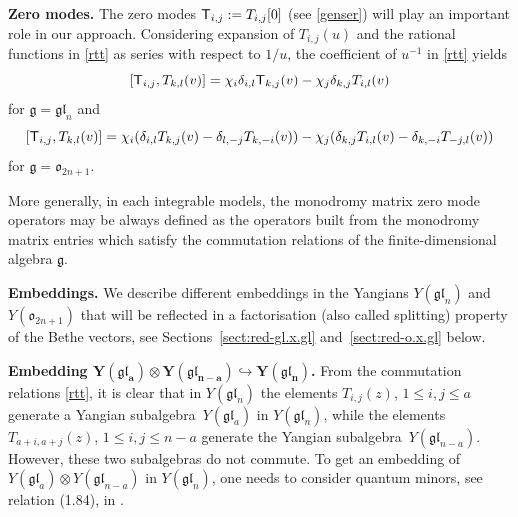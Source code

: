 \documentclass[pdftex]{sigma}
\theoremstyle{definition}
\def\r#1{\eqref{#1}}
\def\sT{{\sf T}}
\def\vk{\chi}
\begin{document}
{\bf Zero modes.}
The zero modes $\sT_{i,j} := T_{i,j}[0]$ (see \eqref{genser}) will play an important role in
our approach.
Considering expansion of $T_{i,j}(u)$ and the rational functions in \r{rtt} as series with respect to $1/u$, the coefficient of $u^{-1}$ in \r{rtt} yields
\begin{equation}
\label{Azm}
[\sT_{i,j},T_{k,l}(v)]=\vk_i \delta_{i,l} \sT_{k,j}(v)- \vk_j \delta_{k,j} T_{i,l}(v)
\end{equation}
for $\mathfrak{g}=\mathfrak{gl}_n$ and
\begin{equation}
\label{zm1}
[\sT_{i,j},T_{k,l}(v)]=\vk_i (\delta_{i,l} T_{k,j}(v)-\delta_{l,-j} T_{k,-i}(v))
-\vk_j (\delta_{k,j} T_{i,l}(v)-\delta_{k,-i} T_{-j,l}(v))
\end{equation}
for $\mathfrak{g}=\mathfrak{o}_{2n+1}$.

More generally,
in each integrable models,
 the monodromy matrix zero mode operators may be always defined as the
 operators built from the monodromy matrix entries
 which
satisfy the commutation relations of the finite-dimensional algebra $\mathfrak{g}$.



{\bf Embeddings.}
We describe different embeddings in the Yangians $Y(\mathfrak{gl}_{n})$ and $Y(\mathfrak{o}_{2n+1})$ that will be reflected in a factorisation (also called splitting) property of the Bethe vectors, see Sections~\ref{sect:red-gl.x.gl} and~\ref{sect:red-o.x.gl} below.


{\bf Embedding $\boldsymbol{Y(\mathfrak{gl}_a)\otimes Y(\mathfrak{gl}_{n-a})
\hookrightarrow Y(\mathfrak{gl}_{n})}$.}
From the commutation relations \eqref{rtt}, it is clear that in $Y(\mathfrak{gl}_{n})$ the elements
$T_{i,j}(z)$, $1\leq i,j\leq a$ generate a Yangian subalgebra~$Y(\mathfrak{gl}_{a})$ in $Y(\mathfrak{gl}_{n})$, while the elements $T_{a+i,a+j}(z)$, $1\leq i,j\leq n-a$ generate the Yangian subalgebra~$Y(\mathfrak{gl}_{n-a})$. However, these two subalgebras do not commute. To get an embedding of~${Y(\mathfrak{gl}_a)\otimes Y(\mathfrak{gl}_{n-a})}$ in $Y(\mathfrak{gl}_{n})$, one needs to consider quantum minors,
see relation (1.84), in \cite[Corollaries 1.7.2 and 1.11.4]{Molev}.
\end{document}
